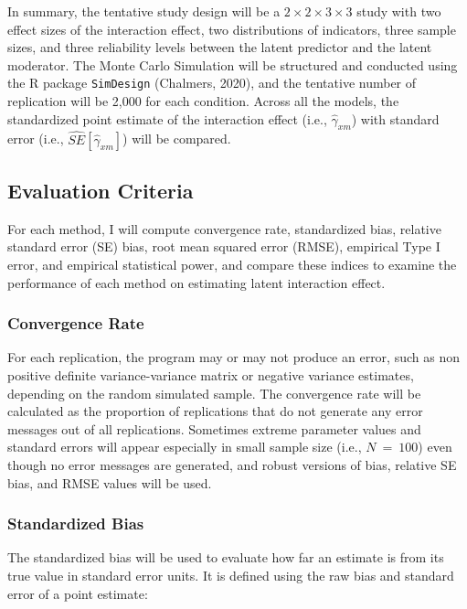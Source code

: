 \documentclass[
  man]{apa7}
\begin{document}
In summary, the tentative study design will be a \(2 \times 2 \times 3 \times 3\) study with two effect sizes of the interaction effect, two distributions of indicators, three sample sizes, and three reliability levels between the latent predictor and the latent moderator. The Monte Carlo Simulation will be structured and conducted using the R package \texttt{SimDesign} (Chalmers, 2020), and the tentative number of replication will be 2,000 for each condition. Across all the models, the standardized point estimate of the interaction effect (i.e., \(\hat{\gamma}_{xm}\)) with standard error (i.e., \(\hat{SE}[\hat{\gamma}_{xm}]\)) will be compared.

\hypertarget{evaluation-criteria}{%
\subsection{Evaluation Criteria}\label{evaluation-criteria}}

For each method, I will compute convergence rate, standardized bias, relative standard error (SE) bias, root mean squared error (RMSE), empirical Type I error, and empirical statistical power, and compare these indices to examine the performance of each method on estimating latent interaction effect.

\hypertarget{convergence-rate}{%
\subsubsection{Convergence Rate}\label{convergence-rate}}

For each replication, the program may or may not produce an error, such as non positive definite variance-variance matrix or negative variance estimates, depending on the random simulated sample. The convergence rate will be calculated as the proportion of replications that do not generate any error messages out of all replications.
Sometimes extreme parameter values and standard errors will appear especially in small sample size (i.e., \(N \ = \ 100\)) even though no error messages are generated, and robust versions of bias, relative SE bias, and RMSE values will be used.

\hypertarget{standardized-bias}{%
\subsubsection{Standardized Bias}\label{standardized-bias}}

The standardized bias will be used to evaluate how far an estimate is from its true value in standard error units. It is defined using the raw bias and standard error of a point estimate:
\end{document}

